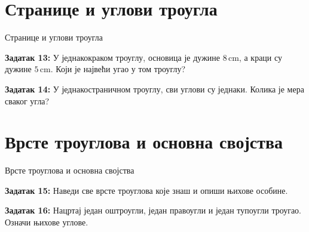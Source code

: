 \documentclass[11pt]{beamer}
\begin{document}
\section{Странице и углови троугла}
\begin{frame}{Странице и углови троугла}

\textbf{Задатак 13:}
У једнакокраком троуглу, основица је дужине
$8 \,\mathrm{cm}$, а краци су дужине $5 \,\mathrm{cm}$.
Који је највећи угао у том троуглу?

\textbf{Задатак 14:}
У једнакостраничном троуглу, сви углови су једнаки. Колика је мера сваког угла?

\end{frame}

\section{Врсте троуглова и основна својства}
\begin{frame}{Врсте троуглова и основна својства}

\textbf{Задатак 15:}
Наведи све врсте троуглова које знаш и опиши њихове особине.

\textbf{Задатак 16:}
Нацртај један оштроугли, један правоугли и један тупоугли троугао.
Означи њихове углове.

\end{frame}
\end{document}

